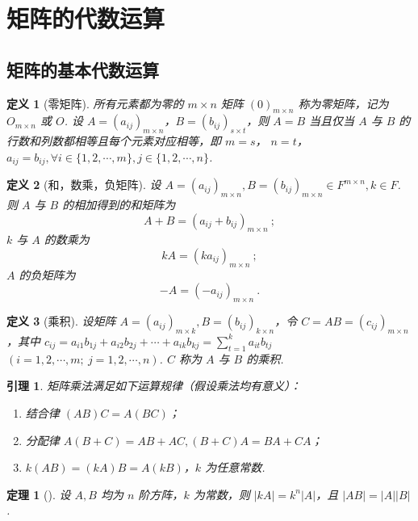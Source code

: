 \documentclass[zihao=-4,UTF8,linespread=1.8,nothm]{aytony_base}
\newtheorem{theorem}{\indent 定理}[subsection]
\newtheorem{lemma}{\indent 引理}[subsection]
\newtheorem{definition}{\indent 定义}[subsection]
\begin{document}
\section{矩阵的代数运算}
\subsection{矩阵的基本代数运算}

\begin{definition}[零矩阵]
    所有元素都为零的 $m \times n$ 矩阵 $(0)_{m \times n}$ 称为零矩阵，记为 $O_{m \times n}$ 或 $O$. 设 $A = (a_{ij})_{m \times n}$，$B = (b_{ij})_{s \times t}$，则 $A = B$ 当且仅当 $A$ 与 $B$ 的行数和列数都相等且每个元素对应相等，即 $m = s$， $n = t$，$a_{ij} = b_{ij}, \forall i \in \{1, 2, \cdots, m\}, j \in \{1, 2, \cdots, n\}$.
\end{definition}

\begin{definition}[和，数乘，负矩阵]
    设 $A = (a_{ij})_{m \times n}, B = (b_{ij})_{m \times n} \in F^{m \times n}, k \in F$. 则 $A $ 与 $B$ 的相加得到的和矩阵为 $$
        A + B = (a_{ij} + b_{ij})_{m \times n}\ ;
    $$ $k $ 与 $A$ 的数乘为 $$
        kA = (ka_{ij})_{m \times n}\ ;
    $$ $A$ 的负矩阵为 $$
        -A = (-a_{ij})_{m \times n}\ .
    $$
\end{definition}

\begin{definition}[乘积]
    设矩阵 $A = (a_{ij})_{m \times k},B = (b_{ij})_{k \times n}$，令 $C = AB = (c_{ij})_{m \times n}$，其中 $c_{ij} = a_{i1}b_{1j} + a_{i2}b_{2j} + \cdots + a_{ik}b_{kj} = \sum\limits_{t=1}^{k}a_{it}b_{tj}$ $(i = 1, 2, \cdots, m;\ j = 1, 2, \cdots, n)$. $C$ 称为 $A$ 与 $B$ 的乘积.
\end{definition}

\begin{lemma}
    矩阵乘法满足如下运算规律（假设乘法均有意义）：
    \begin{enumerate}[nosep]
        \item 结合律 $(AB)C = A(BC)$；
        \item 分配律 $A(B+C) = AB + AC, (B+C)A = BA + CA$；
        \item $k(AB) = (kA)B = A(kB)$，$k$ 为任意常数.
    \end{enumerate}
\end{lemma}

\begin{theorem}[]
    设 $A, B$ 均为 $n$ 阶方阵，$k$ 为常数，则 $|kA| = k^n|A|$，且 $|AB| = |A||B|$.
\end{theorem}
\end{document}

